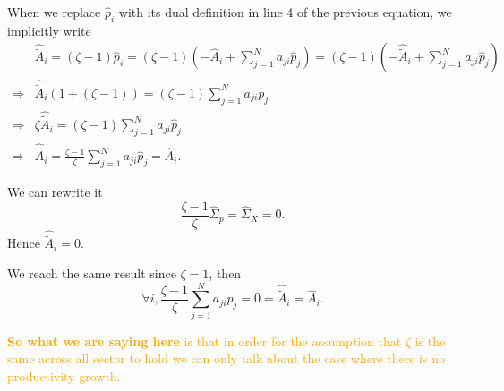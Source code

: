 \documentclass[11pt]{article}
\begin{document}
When we replace $\hat{p}_i$ with its dual definition in line 4 of the previous equation, we implicitly write
\begin{align*}
   & \hat{\tilde{A}}_i=(\zeta-1)\hat{p}_i=(\zeta-1)\left(-\hat{A}_i + \sum_{j=1}^N  a_{ji} \hat{p}_j\right)=(\zeta-1)\left(-\hat{\tilde{A}}_i + \sum_{j=1}^N  a_{ji} \hat{p}_j\right)\\
   \Rightarrow &  \hat{\tilde{A}}_i(1+(\zeta-1))=(\zeta-1)\sum_{j=1}^N  a_{ji} \hat{p}_j\\
   \Rightarrow &  \zeta\hat{\tilde{A}}_i=(\zeta-1)\sum_{j=1}^N  a_{ji} \hat{p}_j\\
   \Rightarrow &  \hat{\tilde{A}}_i=\frac{\zeta-1}{\zeta}\sum_{j=1}^N  a_{ji} \hat{p}_j=\hat{A}_i.
\end{align*}

We can rewrite it 
\begin{equation*}
    \frac{\zeta-1}{\zeta}\hat{\Sigma}_{p}=\hat{\Sigma}_{X}=0.
\end{equation*}
Hence $\hat{\tilde{A}}_i=0$. 

We reach the same result since $\zeta=1$, then
\begin{equation*}
    \forall i, \frac{\zeta-1}{\zeta}\sum_{j=1}^N  a_{ji} \hat{p}_j=0=\hat{\tilde{A}}_i=\hat{A}_i.
\end{equation*}

\textcolor{orange}{
\textbf{So what we are saying here} is that in order for the assumption that $\zeta$ is the same across all sector to hold we can only talk about the case where there is no productivity growth.}



\end{document}
